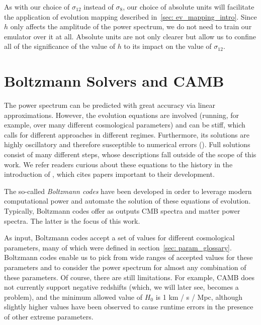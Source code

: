 As with our choice of $\sigma_{12}$ instead of $\sigma_8$, our choice of
absolute units will facilitate the application of evolution mapping described
in~\ref{sec: ev_mapping_intro}. Since $h$ only affects the amplitude of the
power spectrum, we do not need to train our emulator over it at all. Absolute 
units are not only clearer but allow us to confine all of the significance of
the value of $h$ to its impact on the value of $\sigma_{12}$.

\section{Boltzmann Solvers and CAMB}
\label{sec: boltzmann_intro}


The power spectrum can be predicted with great accuracy via linear 
approximations. However, the evolution equations are involved (running, for
example, over many different cosmological parameters) and can be
stiff, which calls for different approaches in different regimes. Furthermore,
its solutions are highly oscillatory and therefore susceptible to numerical
errors (). Full solutions consist of many different steps, whose
descriptions fall outside of the scope of this work. We refer readers curious
about these equations to the history in the introduction of ,
which cites papers important to their development. 


The so-called \textit{Boltzmann codes} have been 
developed in order to leverage modern computational power and automate the
solution of these equations of evolution. Typically, Boltzmann codes offer as
outputs CMB spectra and matter power spectra. The latter is the focus of this
work.


As input, Boltzmann codes accept a set of values for different 
cosmological parameters, many of which were defined in section~\ref{sec: 
param_glossary}. Boltzmann codes enable us to pick from wide ranges of 
accepted values for these parameters and to consider the power 
spectrum for almost any combination of these parameters. Of course, there are 
still limitations. For example, CAMB does not currently support negative 
redshifts (which, we will later see, becomes a problem), and the minimum 
allowed value of $H_0$ is 1 km / s / Mpc, although slightly higher values have 
been observed to cause runtime errors in the presence of other extreme 
parameters.

